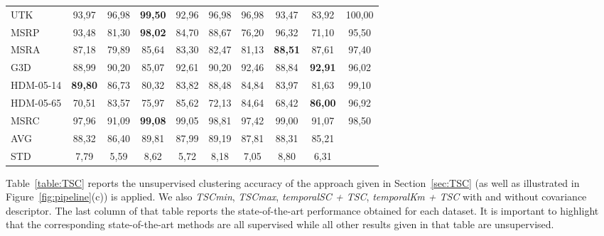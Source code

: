 \documentclass[10pt,a4paper,conference]{IEEEtran}
\begin{document}
\begin{table*}
\begin{tabular}{|l|c|c|c|c|c|c|c|c|c|}
UTK       & 93,97          & 96,98       & \textbf{99,50} & 92,96       & 96,98          & 96,98            & 93,47          & 83,92            & 100,00 \cite{zhang2016efficient}  \\
MSRP      & 93,48          & 81,30       & \textbf{98,02} & 84,70       & 88,67          & 76,20            & 96,32          & 71,10            & 95,50  \cite{cavazza2019scalable} \\
MSRA      & 87,18          & 79,89       & 85,64          & 83,30       & 82,47          & 81,13            & \textbf{88,51} & 87,61            & 97,40  \cite{cavazza2019scalable} \\
G3D       & 88,99          & 90,20       & 85,07          & 92,61       & 90,20          & 92,46            & 88,84          & \textbf{92,91}   & 96,02  \cite{wang2018action}      \\
HDM-05-14 & \textbf{89,80} & 86,73       & 80,32          & 83,82       & 88,48          & 84,84            & 83,97          & 81,63            & 99,10  \cite{cavazza2019scalable} \\
HDM-05-65 & 70,51          & 83,57       & 75,97          & 85,62       & 72,13          & 84,64            & 68,42          & \textbf{86,00}   & 96,92  \cite{du2015hierarchical}  \\
MSRC      & 97,96          & 91,09       & \textbf{99,08} & 99,05       & 98,81          & 97,42            & 99,00          & 91,07            & 98,50  \cite{cavazza2019scalable} \\ \hline
AVG       & 88,32          & 86,40       & 89,81          & 87,99       & 89,19          & 87,81            & 88,31          & 85,21            &                                   \\
STD       & 7,79           & 5,59        & 8,62           & 5,72        & 8,18           & 7,05             & 8,80           & 6,31             &                                   \\ \hline
\end{tabular}
\end{table*}

Table~\ref{table:TSC} reports the unsupervised clustering accuracy of the approach given in Section~\ref{sec:TSC} (as well as illustrated in Figure~\ref{fig:pipeline}(c)) is applied. We also \emph{TSCmin}, \emph{TSCmax}, \emph{temporalSC + TSC}, \emph{temporalKm + TSC} with and without covariance descriptor.
The last column of that table reports the state-of-the-art performance obtained for each dataset. It is important to highlight that the corresponding state-of-the-art methods are all supervised while all other results given in that table are unsupervised.
\end{document}
